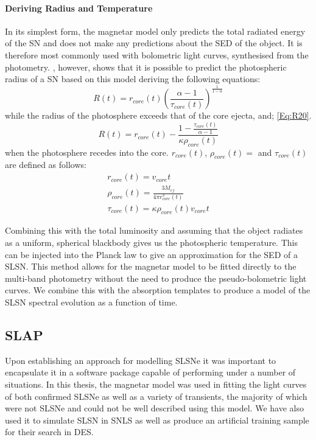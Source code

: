 \paragraph{Deriving Radius and Temperature}
In its simplest form, the magnetar model only predicts the total radiated energy of the SN and does not make any predictions about the SED of the object. It is therefore most commonly used with bolometric light curves, synthesised from the photometry. \citet{Inserra2013}, however, shows that it is possible to predict the photospheric radius of a SN based on this model deriving the following equations:
\begin{equation}
\label{Eq:R19}
R(t) = r_{core}(t) \left(\frac{\alpha - 1}{\tau_{core}(t)}\right)^\frac{1}{1 - \alpha}
\end{equation}
\noindent while the radius of the photosphere exceeds that of the core ejecta, and;
\ref{Eq:R20}.
\begin{equation}
\label{Eq:R20}
R(t) = r_{core}(t) - \frac{1 - \frac{\tau_{core}(t)}{\alpha - 1}}{\kappa \rho_{core}(t)}
\end{equation}
\noindent when the photosphere recedes into the core. $r_{core}(t)$, $\rho_{core}(t)=$ and $\tau_{core}(t)$ are defined as follows:
\begin{align}
r_{core}(t) = v_{core}  t \\
\rho_{core}(t)= \frac{3 M_{ej}}{4  \pi  r_{core}^3(t)}\\
\tau_{core}(t) = \kappa  \rho_{core}(t) v_{core} t
\end{align}

Combining this with the total luminosity and assuming that the object radiates as a uniform, spherical blackbody gives us the photospheric temperature. This can be injected into the Planck law to give an approximation for the SED of a SLSN. This method allows for the magnetar model to be fitted directly to the multi-band photometry without the need to produce the pseudo-bolometric light curves. We combine this with the absorption templates to produce a model of the SLSN spectral evolution as a function of time.

\subsection{SLAP}
Upon establishing an approach for modelling SLSNe it was important to encapsulate it in a software package capable of performing under a number of situations. In this thesis, the magnetar model was used in fitting the light curves of both confirmed SLSNe as well as a variety of transients, the majority of which were not SLSNe and could not be well described using this model. We have also used it to simulate SLSN in SNLS as well as produce an artificial training sample for their search in DES.

